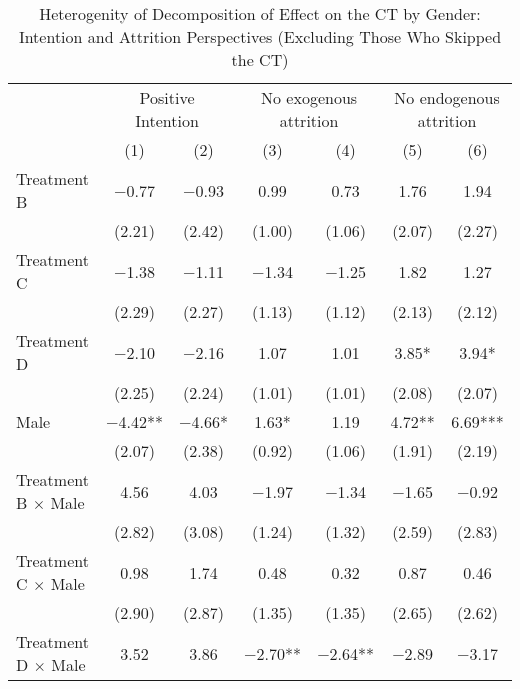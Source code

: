 \documentclass[12pt, a4paper]{article}
\begin{document}
\begin{table}

\caption{\label{tab:lm-interaction-gender-test-decompose-noskip}Heterogenity of Decomposition of Effect on the CT by Gender: Intention and Attrition Perspectives (Excluding Those Who Skipped the CT)}
\centering
\fontsize{9}{11}\selectfont
\begin{threeparttable}
\begin{tabular}[t]{lcccccc}
\toprule
\multicolumn{1}{c}{ } & \multicolumn{2}{c}{Positive Intention} & \multicolumn{2}{c}{No exogenous attrition} & \multicolumn{2}{c}{No endogenous attrition} \\
\cmidrule(l{3pt}r{3pt}){2-3} \cmidrule(l{3pt}r{3pt}){4-5} \cmidrule(l{3pt}r{3pt}){6-7}
  & (1) & (2) & (3) & (4) & (5) & (6)\\
\midrule
Treatment B & \num{-0.77} & \num{-0.93} & \num{0.99} & \num{0.73} & \num{1.76} & \num{1.94}\\
 & (\num{2.21}) & (\num{2.42}) & (\num{1.00}) & (\num{1.06}) & (\num{2.07}) & (\num{2.27})\\
Treatment C & \num{-1.38} & \num{-1.11} & \num{-1.34} & \num{-1.25} & \num{1.82} & \num{1.27}\\
 & (\num{2.29}) & (\num{2.27}) & (\num{1.13}) & (\num{1.12}) & (\num{2.13}) & (\num{2.12})\\
Treatment D & \num{-2.10} & \num{-2.16} & \num{1.07} & \num{1.01} & \num{3.85}* & \num{3.94}*\\
 & (\num{2.25}) & (\num{2.24}) & (\num{1.01}) & (\num{1.01}) & (\num{2.08}) & (\num{2.07})\\
Male & \num{-4.42}** & \num{-4.66}* & \num{1.63}* & \num{1.19} & \num{4.72}** & \num{6.69}***\\
 & (\num{2.07}) & (\num{2.38}) & (\num{0.92}) & (\num{1.06}) & (\num{1.91}) & (\num{2.19})\\
Treatment B $\times$ Male & \num{4.56} & \num{4.03} & \num{-1.97} & \num{-1.34} & \num{-1.65} & \num{-0.92}\\
 & (\num{2.82}) & (\num{3.08}) & (\num{1.24}) & (\num{1.32}) & (\num{2.59}) & (\num{2.83})\\
Treatment C $\times$ Male & \num{0.98} & \num{1.74} & \num{0.48} & \num{0.32} & \num{0.87} & \num{0.46}\\
 & (\num{2.90}) & (\num{2.87}) & (\num{1.35}) & (\num{1.35}) & (\num{2.65}) & (\num{2.62})\\
Treatment D $\times$ Male & \num{3.52} & \num{3.86} & \num{-2.70}** & \num{-2.64}** & \num{-2.89} & \num{-3.17}\\

\end{tabular}
\end{threeparttable}
\end{table}
\end{document}
